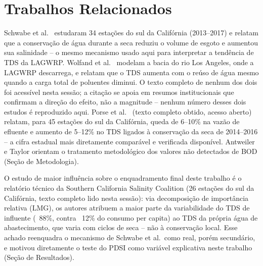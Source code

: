 \section{Trabalhos Relacionados}

Schwabe et al.\ \cite{schwabe2020unintended} estudaram 34 estações do sul da Califórnia (2013--2017) e relatam que a conservação de água durante a seca reduziu o volume de esgoto e aumentou sua salinidade -- o mesmo mecanismo usado aqui para interpretar a tendência de TDS da LAGWRP. Wolfand et al.\ \cite{wolfand2022dilution} modelam a bacia do rio Los Angeles, onde a LAGWRP descarrega, e relatam que o TDS aumenta com o reúso de água mesmo quando a carga total de poluentes diminui. O texto completo de nenhum dos dois foi acessível nesta sessão; a citação se apoia em resumos institucionais que confirmam a direção do efeito, não a magnitude -- nenhum número desses dois estudos é reproduzido aqui. Porse et al.\ \cite{porse2023adapting} (texto completo obtido, acesso aberto) relatam, para 45 estações do sul da Califórnia, queda de 6--10\% na vazão de efluente e aumento de 5--12\% no TDS ligados à conservação da seca de 2014--2016 -- a cifra estadual mais diretamente comparável e verificada disponível. Antweiler e Taylor \cite{antweiler2008evaluation} orientam o tratamento metodológico dos valores não detectados de BOD (Seção de Metodologia).

O estudo de maior influência sobre o enquadramento final deste trabalho é o relatório técnico da Southern California Salinity Coalition \cite{scsc2018tds} (26 estações do sul da Califórnia, texto completo lido nesta sessão): via decomposição de importância relativa (LMG), os autores atribuem a maior parte da variabilidade do TDS de influente (~88\%, contra ~12\% do consumo per capita) ao TDS da própria água de abastecimento, que varia com ciclos de seca -- não à conservação local. Esse achado reenquadra o mecanismo de Schwabe et al.\ como real, porém secundário, e motivou diretamente o teste do PDSI como variável explicativa neste trabalho (Seção de Resultados).

